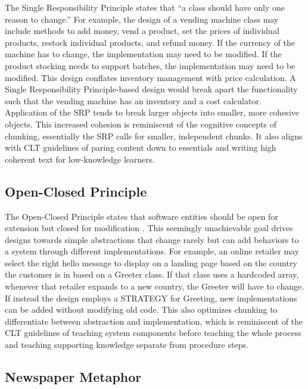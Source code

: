 The Single Responsibility Principle states that “a class should have only one reason to change.” \cite{Martin2002} For example, the design of a vending machine class may include methods to add money, vend a product, set the prices of individual products, restock individual products, and refund money. If the currency of the machine has to change, the implementation may need to be modified. If the product stocking needs to support batches, the implementation may need to be modified. This design conflates inventory management with price calculation. A Single Responsibility Principle-based design would break apart the functionality such that the vending machine has an inventory and a cost calculator. Application of the SRP tends to break larger objects into smaller, more cohesive objects. This increased cohesion is reminiscent of the cognitive concepts of chunking, essentially the SRP calls for smaller, independent chunks. It also aligns with CLT guidelines of paring content down to essentials and writing high coherent text for low-knowledge learners.

\subsection{Open-Closed Principle}

The Open-Closed Principle states that software entities should be open for extension but closed for modification \cite{Martin2002}. This seemingly unachievable goal drives designs towards simple abstractions that change rarely but can add behaviors to a system through different implementations. For example, an online retailer may select the right hello message to display on a landing page based on the country the customer is in based on a Greeter class. If that class uses a hardcoded array, whenever that retailer expands to a new country, the Greeter will have to change. If instead the design employs a STRATEGY for Greeting, new implementations can be added without modifying old code. This also optimizes chunking to differentiate between abstraction and implementation, which is reminiscent of the CLT guidelines of teaching system components before teaching the whole process and teaching supporting knowledge separate from procedure steps.

\subsection{Newspaper Metaphor}

